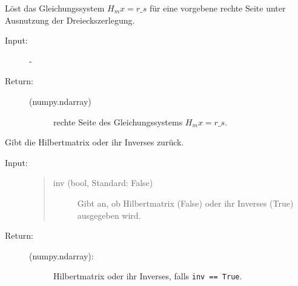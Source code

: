 \documentclass[letterpaper,10pt,ngerman, oneside, openright]{sphinxmanual}
\begin{document}
\begin{fulllineitems}
\begin{fulllineitems}
\begin{description}
\begin{description}
\end{description}

\end{description}

\end{fulllineitems}


\begin{fulllineitems}
\label{\detokenize{index:hilbertmatr.Hilbert.lgs_lsg}}
Löst das Gleichungssystem $H_mx=r\_s$ für eine vorgebene rechte Seite unter Ausnutzung der
Dreieckszerlegung.

\begin{description}
\item [{Input:}] -
\end{description}
\begin{description}
\item[{Return:}] \leavevmode\begin{description}
\item[{(numpy.ndarray)}] \leavevmode
rechte Seite des Gleichungssystems $H_mx=r\_s$.

\end{description}\end{description}

\end{fulllineitems}


\begin{fulllineitems}
\label{\detokenize{index:hilbertmatr.Hilbert.return_hil_matr}}
Gibt die Hilbertmatrix oder ihr Inverses zurück.
\begin{description}
\item [{Input:}] 


\begin{quote}
\begin{description}
\item[{inv (bool, Standard: False)}] \leavevmode
Gibt an, ob Hilbertmatrix (False) oder ihr Inverses (True) ausgegeben wird.
\end{description}

\end{quote}\end{description}
\begin{description}
\item[{Return:}] \leavevmode\begin{description}
\item[{(numpy.ndarray):}] \leavevmode
Hilbertmatrix oder ihr Inverses, falls \texttt{inv == True}.

\end{description}

\end{description}

\end{fulllineitems}


\end{fulllineitems}
\end{document}
